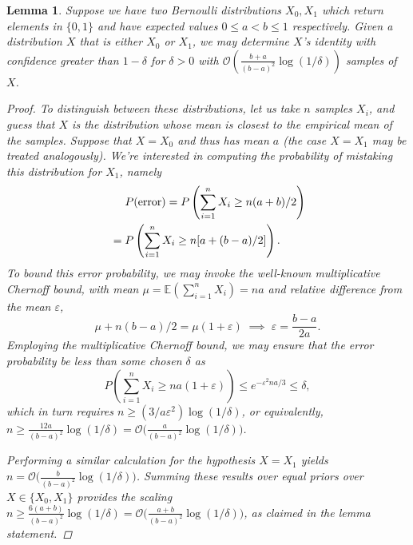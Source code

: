 \documentclass[aps,pra,showpacs,notitlepage,twocolumn,superscriptaddress,nofootinbib]{revtex4-1}
\newtheorem{lemma}[theorem]{Lemma}
\begin{document}
    \begin{lemma} \label{lemma:multiplicative_chernoff_bound}
        Suppose we have two Bernoulli distributions $X_0, X_1$ which return elements in $\{0, 1\}$ and have expected values $0 \leq a < b \leq 1$ respectively. Given a distribution $X$ that is either $X_0$ or $X_1$, we may determine $X$'s identity with confidence greater than $1 - \delta$ for $\delta > 0$ with $\mathcal{O}\left(\frac{b + a}{(b - a)^2}\log(1/\delta)\right)$ samples of $X$.
        
        \begin{proof}
            To distinguish between these distributions, let us take $n$ samples $X_i$, and guess that $X$ is the distribution whose mean is closest to the empirical mean of the samples. Suppose that $X = X_0$ and thus has mean $a$ (the case $X=X_1$ may be treated analogously). We're interested in computing the probability of mistaking this distribution for $X_1$, namely
            \begin{align}
                &\hphantom{{}={}}P(\text{error}) = P\left(\sum_{i=1}^n X_i \geq n(a+b)/2 \right) \nonumber\\ 
                &= P\left(\sum_{i=1}^n X_i \geq n[a + (b-a)/2] \right).
            \end{align}
            To bound this error probability, we may invoke the well-known multiplicative Chernoff bound, with mean $\mu=\mathbb{E}(\sum_{i=1}^n X_i) = na$ and relative difference from the mean $\varepsilon$,
                \begin{equation}
                    \mu + n(b - a)/2 = \mu(1 + \varepsilon)
                    \;\implies\;
                    \varepsilon = \frac{b - a}{2a}.
                \end{equation}
            Employing the multiplicative Chernoff bound, we may ensure that the error probability be less than some chosen $\delta$ as
                \begin{equation}
                    P\left(\sum_{i=1}^n X_i \geq na(1+\varepsilon) \right) \leq e^{-\varepsilon^2 n a/3} \leq \delta,
                \end{equation}
            which in turn requires $n \geq (3/a\varepsilon^2)\log(1/\delta)$, or equivalently, $n \geq \frac{12a}{(b - a)^2}\log(1/\delta) = \mathcal{O}\big(\frac{a}{(b - a)^2}\log(1/\delta)\big)$. 
            
            Performing a similar calculation for the hypothesis $X=X_1$ yields $n = \mathcal{O}\big(\frac{b}{(b - a)^2}\log(1/\delta)\big)$. Summing these results over equal priors over $X \in \{X_0, X_1\}$ provides the scaling $n \geq \frac{6(a+b)}{(b - a)^2}\log(1/\delta) = \mathcal{O}\big(\frac{a+b}{(b - a)^2}\log(1/\delta)\big)$, as claimed in the lemma statement.
        \end{proof}
    \end{lemma}
    
\end{document}
